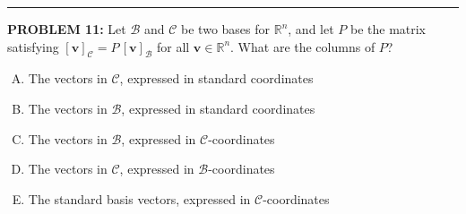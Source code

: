 \documentclass[12pt]{amsart}
\newcommand{\divider}{
  \vspace{-1em} %
  \noindent
  \raisebox{-0.15ex}{\textbullet}%
  \hspace{0.5em}%
  \rule[0.5ex]{0.95\textwidth}{1.0pt}%
  \hspace{0.5em}%
  \raisebox{-0.15ex}{\textbullet}%
  \vspace{0em} %
}
\begin{document}
\divider



\newpage




{\bf PROBLEM 11:}
%
Let $\mathcal{B}$ and $\mathcal{C}$ be two bases for $\mathbb{R}^n$, and let $P$ be the matrix satisfying $[\mathbf{v}]_\mathcal{C} = P\,[\mathbf{v}]_\mathcal{B}$ for all $\mathbf{v} \in \mathbb{R}^n$. What are the columns of $P$?

\begin{enumerate}[(A)]
\item The vectors in $\mathcal{C}$, expressed in standard coordinates
\item The vectors in $\mathcal{B}$, expressed in standard coordinates
\item The vectors in $\mathcal{B}$, expressed in $\mathcal{C}$-coordinates
\item The vectors in $\mathcal{C}$, expressed in $\mathcal{B}$-coordinates
\item The standard basis vectors, expressed in $\mathcal{C}$-coordinates
\end{enumerate}
\end{document}
